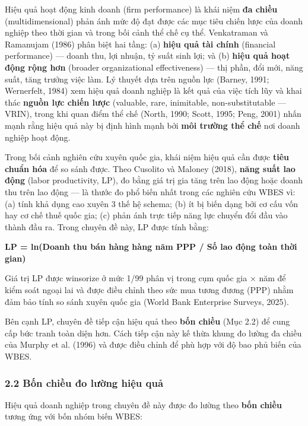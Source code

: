 \documentclass[12pt,a4paper]{article}
\begin{document}
Hiệu quả hoạt động kinh doanh (firm performance) là khái niệm \textbf{đa
chiều} (multidimensional) phản ánh mức độ đạt được các mục tiêu chiến
lược của doanh nghiệp theo thời gian và trong bối cảnh thể chế cụ thể.
Venkatraman và Ramanujam (1986) phân biệt hai tầng: (a) \textbf{hiệu quả
tài chính} (financial performance) --- doanh thu, lợi nhuận, tỷ suất
sinh lợi; và (b) \textbf{hiệu quả hoạt động rộng hơn} (broader
organizational effectiveness) --- thị phần, đổi mới, năng suất, tăng
trưởng việc làm. Lý thuyết dựa trên nguồn lực (Barney, 1991; Wernerfelt,
1984) xem hiệu quả doanh nghiệp là kết quả của việc tích lũy và khai
thác \textbf{nguồn lực chiến lược} (valuable, rare, inimitable,
non-substitutable --- VRIN), trong khi quan điểm thể chế (North, 1990;
Scott, 1995; Peng, 2001) nhấn mạnh rằng hiệu quả này bị định hình mạnh
bởi \textbf{môi trường thể chế} nơi doanh nghiệp hoạt động.

Trong bối cảnh nghiên cứu xuyên quốc gia, khái niệm hiệu quả cần được
\textbf{tiêu chuẩn hóa} để so sánh được. Theo Cusolito và Maloney
(2018), \textbf{năng suất lao động} (labor productivity, LP), đo bằng
giá trị gia tăng trên lao động hoặc doanh thu trên lao động --- là thước
đo phổ biến nhất trong các nghiên cứu WBES vì: (a) tính khả dụng cao
xuyên 3 thế hệ schema; (b) ít bị biến dạng bởi cơ cấu vốn hay cơ chế
thuế quốc gia; (c) phản ánh trực tiếp năng lực chuyển đổi đầu vào thành
đầu ra. Trong chuyên đề này, LP được tính bằng:

\textbf{LP = ln(Doanh thu bán hàng hàng năm PPP / Số lao động toàn thời
gian)}

Giá trị LP được winsorize ở mức 1/99 phân vị trong cụm quốc gia × năm để
kiểm soát ngoại lai và được điều chỉnh theo sức mua tương đương (PPP)
nhằm đảm bảo tính so sánh xuyên quốc gia (World Bank Enterprise Surveys,
2025).

Bên cạnh LP, chuyên đề tiếp cận hiệu quả theo \textbf{bốn chiều} (Mục
2.2) để cung cấp bức tranh toàn diện hơn. Cách tiếp cận này kế thừa
khung đo lường đa chiều của Murphy et al. (1996) và được điều chỉnh để
phù hợp với độ bao phủ biến của WBES.

\hypertarget{22-bux1ed1n-chiux1ec1u-ux111o-lux1b0ux1eddng-hiux1ec7u-quux1ea3}{%
\subsubsection{2.2 Bốn chiều đo lường hiệu
quả}\label{22-bux1ed1n-chiux1ec1u-ux111o-lux1b0ux1eddng-hiux1ec7u-quux1ea3}}

Hiệu quả doanh nghiệp trong chuyên đề này được đo lường theo \textbf{bốn
chiều} tương ứng với bốn nhóm biến WBES:
\end{document}
